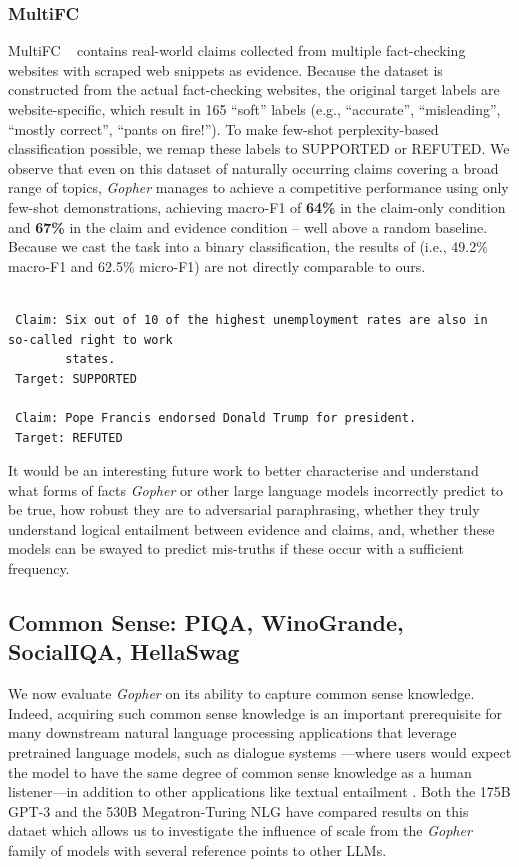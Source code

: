 \documentclass[11pt, a4paper, logo, internal, copyright, nonumbering]{deepmind}
\newcommand{\gopher}{\textit{Gopher}\xspace}
\begin{document}
\subsubsection{MultiFC}
MultiFC ~\citep{Augenstein:etal:2019} contains real-world claims collected from multiple fact-checking websites with scraped web snippets as evidence. Because the dataset is constructed from the actual fact-checking websites, the original target labels are website-specific, which result in 165 ``soft'' labels (e.g., ``accurate'', ``misleading'', ``mostly correct'', ``pants on fire!''). To make few-shot perplexity-based classification possible, we remap these labels to SUPPORTED or REFUTED. We observe that even on this dataset of naturally occurring claims covering a broad range of topics, \gopher manages to achieve a competitive performance using only few-shot demonstrations, achieving macro-F1 of \textbf{64\%} in the claim-only condition and \textbf{67\%} in the claim and evidence condition -- well above a random baseline. Because we cast the task into a binary classification, the results of \cite{Augenstein:etal:2019} (i.e., 49.2\% macro-F1 and 62.5\% micro-F1) are not directly comparable to ours. 

{
 \footnotesize
 \begin{verbatim}

 Claim: Six out of 10 of the highest unemployment rates are also in so-called right to work
        states.
 Target: SUPPORTED

 Claim: Pope Francis endorsed Donald Trump for president.	
 Target: REFUTED
 \end{verbatim}
 }

It would be an interesting future work to better characterise and understand what forms of facts \gopher or other large language models incorrectly predict to be true, how robust they are to adversarial paraphrasing, whether they truly understand logical entailment between evidence and claims, and, whether these models can be swayed to predict mis-truths if these occur with a sufficient frequency.

\subsection{Common Sense: PIQA, WinoGrande, SocialIQA, HellaSwag}
\label{sec:common_sense}

We now evaluate \gopher on its ability to capture common sense knowledge. Indeed, acquiring such common sense knowledge is an important prerequisite for many downstream natural language processing applications that leverage pretrained language models, such as dialogue systems \citep{Young_Cambria_Chaturvedi_Zhou_Biswas_Huang_2018,zhou-etal-2018-commonsense}---where users would expect the model to have the same degree of common sense knowledge as a human listener---in addition to other applications like textual entailment \citep{Dagan:2005}. Both the 175B GPT-3 \citep{gpt3} and the 530B Megatron-Turing NLG \citep{Megatron-Turing} have compared results on this dataet which allows us to investigate the influence of scale from the \gopher family of models with several reference points to other LLMs.
\end{document}
